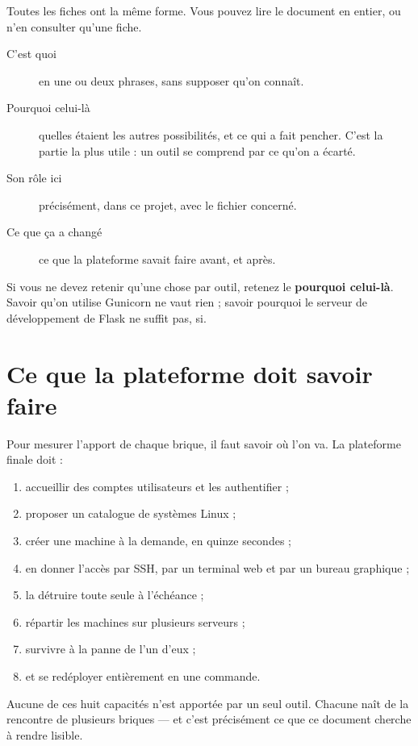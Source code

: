 Toutes les fiches ont la même forme. Vous pouvez lire le document en entier,
ou n'en consulter qu'une fiche.

\begin{description}
\item[C'est quoi] en une ou deux phrases, sans supposer qu'on connaît.
\item[Pourquoi celui-là] quelles étaient les autres possibilités, et ce qui a
  fait pencher. C'est la partie la plus utile : un outil se comprend par ce
  qu'on a écarté.
\item[Son rôle ici] précisément, dans ce projet, avec le fichier concerné.
\item[Ce que ça a changé] ce que la plateforme savait faire avant, et après.
\end{description}

\begin{retenir}
Si vous ne devez retenir qu'une chose par outil, retenez le \textbf{pourquoi
celui-là}. Savoir qu'on utilise Gunicorn ne vaut rien ; savoir pourquoi le
serveur de développement de Flask ne suffit pas, si.
\end{retenir}

\section*{Ce que la plateforme doit savoir faire}

Pour mesurer l'apport de chaque brique, il faut savoir où l'on va. La
plateforme finale doit :

\begin{enumerate}
\item accueillir des comptes utilisateurs et les authentifier ;
\item proposer un catalogue de systèmes Linux ;
\item créer une machine à la demande, en quinze secondes ;
\item en donner l'accès par SSH, par un terminal web et par un bureau
  graphique ;
\item la détruire toute seule à l'échéance ;
\item répartir les machines sur plusieurs serveurs ;
\item survivre à la panne de l'un d'eux ;
\item et se redéployer entièrement en une commande.
\end{enumerate}

Aucune de ces huit capacités n'est apportée par un seul outil. Chacune naît de
la rencontre de plusieurs briques --- et c'est précisément ce que ce document
cherche à rendre lisible.
